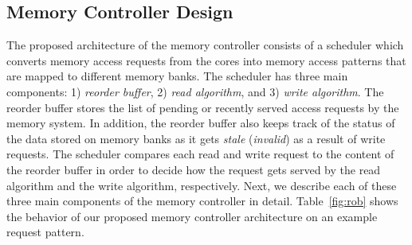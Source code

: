 

\subsection{Memory Controller Design}
\label{sec:controller}
The proposed architecture of the memory controller consists of a scheduler which converts memory access requests from the cores into memory access patterns that are mapped to different memory banks. The scheduler has three main components: 1) {\em reorder buffer}, 2) {\em read algorithm}, and 3) {\em write algorithm}. The reorder buffer stores the list of pending or recently served access requests by the memory system. In addition, the reorder buffer also keeps track of the status of the data stored on memory banks as it gets {\em stale} ({\em invalid}) as a result of write requests. The scheduler compares each read and write request to the content of the reorder buffer in order to decide how the request gets served by the read algorithm and the write algorithm, respectively. Next, we describe each of these three main components of the memory controller in detail. 
Table~\ref{fig:rob} shows the behavior of our proposed memory controller architecture on an example request pattern.
%

